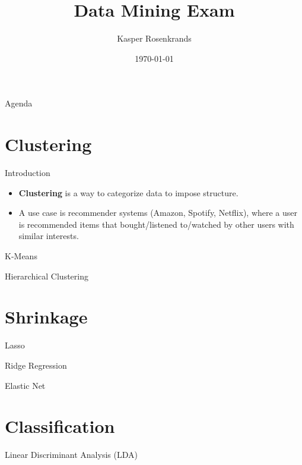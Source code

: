\documentclass[10pt]{beamer}
\title{Data Mining Exam}
\date{\today}
\author{
  Kasper Rosenkrands
}
\institute[
] %
{%
  Aalborg University\\
  Denmark
  
}
\begin{document}
{\aauwavesbg%
\begin{frame} %
  \titlepage
\end{frame}}

\begin{frame}{Agenda}{}
\tableofcontents
\end{frame}

\section{Clustering}

\begin{frame}{\secname}{Introduction}
  \begin{itemize}
    \item \textbf{Clustering} is a way to categorize data to impose structure.
    \item A use case is recommender systems (Amazon, Spotify, Netflix), where a user is recommended items that bought/listened to/watched by other users with similar interests.
  \end{itemize}
\end{frame}

\begin{frame}{\secname}{K-Means}
\end{frame}

\begin{frame}{\secname}{Hierarchical Clustering}
\end{frame}

\section{Shrinkage}
\begin{frame}{\secname}{Lasso}
\end{frame}

\begin{frame}{\secname}{Ridge Regression}
\end{frame}

\begin{frame}{\secname}{Elastic Net}
\end{frame}

\section{Classification}
\begin{frame}{\secname}{Linear Discriminant Analysis (LDA)}
\end{frame}
\end{document}
